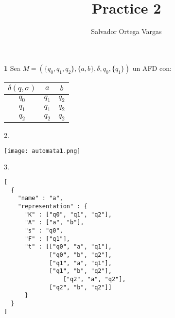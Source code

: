 \documentclass{article}
\title{Practice 2 }
\author{Salvador Ortega Vargas}
\begin{document}
\maketitle

\textbf{1} Sea $M=(\{q_0,q_1,q_2\}, \{a,b\}, \delta, q_0, \{q_1\})$ un AFD con:\\

\begin{table}[h!]
\begin{tabular}{c|c|c}
  $\delta(q,\sigma)$ & $a$ & $b$\\
  \hline
  $q_0$& $q_1$ & $q_2$\\
  \hline
  $q_1$& $q_1$ & $q_2$\\
  \hline
  $q_2$& $q_2$ & $q_2$\\
  
\end{tabular}
\end{table}







2.


\texttt{[image: automata1.png]}



3.


\begin{verbatim}
[
  {
    "name" : "a",
    "representation" : {
      "K" : ["q0", "q1", "q2"],
      "A" : ["a", "b"],
      "s" : "q0",
      "F" : ["q1"],
      "t" : [["q0", "a", "q1"],
             ["q0", "b", "q2"],
             ["q1", "a", "q1"],
             ["q1", "b", "q2"],
	             ["q2", "a", "q2"],
             ["q2", "b", "q2"]]
      }
  }
]
\end{verbatim}
\end{document}
